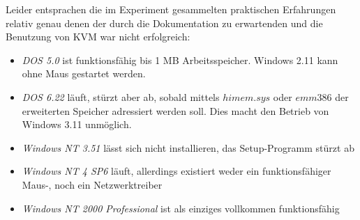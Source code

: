 	Leider entsprachen die im Experiment gesammelten praktischen Erfahrungen relativ genau denen der durch die Dokumentation zu erwartenden und die Benutzung von KVM war nicht erfolgreich:
	\begin{itemize}
		\item \emph{DOS 5.0} ist funktionsfähig bis 1 MB Arbeitsspeicher. Windows 2.11 kann ohne Maus gestartet werden.
		\item \emph{DOS 6.22} läuft, stürzt aber ab, sobald mittels $himem.sys$ oder $emm386$ der erweiterten Speicher adressiert werden soll. Dies macht den Betrieb von Windows 3.11 unmöglich.
		\item \emph{Windows NT 3.51} lässt sich nicht installieren, das Setup-Programm stürzt ab
		\item \emph{Windows NT 4 SP6} läuft, allerdings existiert weder ein funktionsfähiger Maus-, noch ein Netzwerktreiber
		\item \emph{Windows NT 2000 Professional} ist als einziges vollkommen funktionsfähig
	\end{itemize}

